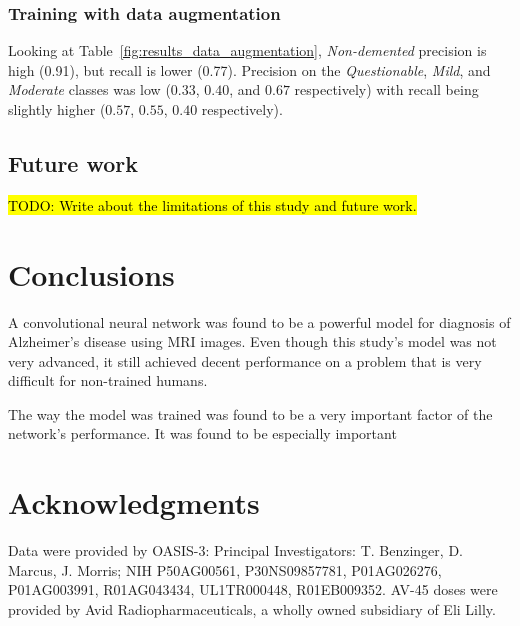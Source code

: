 \documentclass{kththesis}
\begin{document}
\subsection{Training with data augmentation}
Looking at Table~\ref{fig:results_data_augmentation}, \textit{Non-demented} precision is high (0.91), but recall is lower (0.77). Precision on the \textit{Questionable}, \textit{Mild}, and \textit{Moderate} classes was low ($0.33$, $0.40$, and $0.67$ respectively) with recall being slightly higher ($0.57$, $0.55$, $0.40$ respectively).

\section{Future work}
\hl{TODO: Write about the limitations of this study and future work.}

\chapter{Conclusions}
A convolutional neural network was found to be a powerful model for diagnosis of Alzheimer’s disease using MRI images. Even though this study's model was not very advanced, it still achieved decent performance on a problem that is very difficult for non-trained humans.

The way the model was trained was found to be a very important factor of the network's performance. It was found to be especially important 

\chapter{Acknowledgments}
Data were provided by OASIS-3: Principal Investigators: T. Benzinger, D. Marcus, J. Morris; NIH P50AG00561, P30NS09857781, P01AG026276, P01AG003991, R01AG043434, UL1TR000448, R01EB009352. AV-45 doses were provided by Avid Radiopharmaceuticals, a wholly owned subsidiary of Eli Lilly.

\printbibliography[heading=bibintoc]

\appendix


\tailmatter
\end{document}
